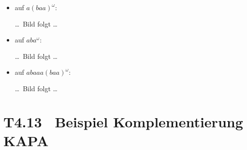 \documentclass[fontsize=11pt, twoside=false, numbers=autoenddot]{scrbook}
\begin{document}
\parII
{}
%
\begin{itemize}
  \item
    auf $a(baa)^\omega$:
    \begin{center}
      \dots\ Bild folgt \dots
    \end{center}
  \item
    auf $aba^\omega$:
    \begin{center}
      \dots\ Bild folgt \dots
    \end{center}
  \item
    auf $abaaa(baa)^\omega$:~
    \begin{center}
      \dots\ Bild folgt \dots
    \end{center}
\end{itemize}

\section*{T4.13~ Beispiel Komplementierung KAPA}
\end{document}
